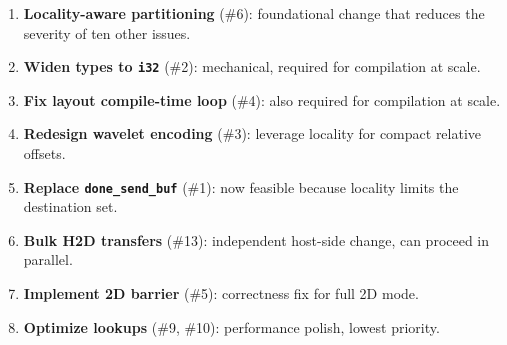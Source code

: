 \documentclass[11pt,letterpaper]{article}
\begin{document}
\begin{enumerate}[nosep]
  \item \textbf{Locality-aware partitioning} (\#6): foundational change that reduces the severity of ten other issues.
  \item \textbf{Widen types to \texttt{i32}} (\#2): mechanical, required for compilation at scale.
  \item \textbf{Fix layout compile-time loop} (\#4): also required for compilation at scale.
  \item \textbf{Redesign wavelet encoding} (\#3): leverage locality for compact relative offsets.
  \item \textbf{Replace \texttt{done\_send\_buf}} (\#1): now feasible because locality limits the destination set.
  \item \textbf{Bulk H2D transfers} (\#13): independent host-side change, can proceed in parallel.
  \item \textbf{Implement 2D barrier} (\#5): correctness fix for full 2D mode.
  \item \textbf{Optimize lookups} (\#9, \#10): performance polish, lowest priority.
\end{enumerate}
\end{document}
